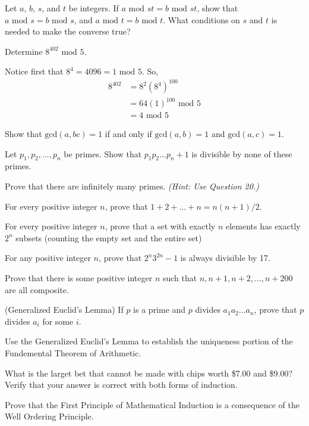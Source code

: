 \documentclass[11pt,largemargins]{homework}
\begin{document}
\question 
Let $a$, $b$, $s$, and $t$ be integers. If $a\text{ mod }st=b\text{ mod }st$, show that 
$a\text{ mod }s=b\text{ mod }s$, and $a\text{ mod }t=b\text{ mod }t$. What conditions on $s$ and $t$ 
is needed to make the converse true?

\question 
Determine $8^{402}\text{ mod }5$.

\quad Notice first that $8^4 = 4096 = 1\text{ mod }5$. So,
\begin{align*}
    8^{402} &= 8^2(8^4)^{100}\\
            &= 64(1)^{100}\text{ mod }5\\
            &= 4 \text{ mod }5
\end{align*}


\question 
Show that $\text{gcd}(a,bc)=1$ if and only if $\text{gcd}(a,b)=1$ and $\text{gcd}(a,c)=1$.

\question 
Let $p_1,p_2,...,p_n$ be primes. Show that $p_1p_2...p_n+1$ is divisible by none of these primes.

\question 
Prove that there are infinitely many primes. \textit{(Hint: Use Question 20.)}

\question 
For every positive integer $n$, prove that $1+2+...+n=n(n+1)/2$.

\question 
For every positive integer $n$, prove that a set with exactly $n$ elements has exactly $2^n$ subsets (counting the empty 
set and the entire set)

\question 
For any positive integer $n$, prove that $2^n3^{2n}-1$ is always divisible by 17.

\question 
Prove that there is some positive integer $n$ such that $n, n+1, n+2,...,n+200$ are all composite.

\question 
(Generalized Euclid's Lemma) If $p$ is a prime and $p$ divides $a_1a_2...a_n$, prove that $p$ divides $a_i$ for some $i$.

\question 
Use the Generalized Euclid's Lemma to establish the uniqueness portion of the Fundemental Theorem of Arithmetic.

\question What is the larget bet that cannot be made with chips worth \$7.00 and \$9.00? Verify that your answer is 
correct with both forms of induction.

\question 
Prove that the First Principle of Mathematical Induction is a consequence of the Well Ordering Principle.
\end{document}
